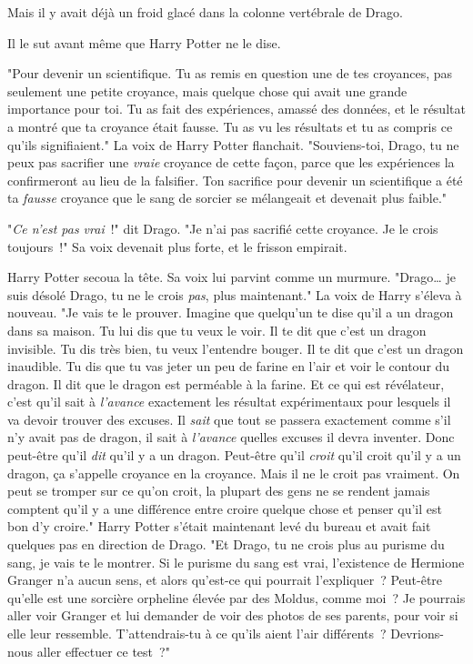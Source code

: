 Mais il y avait déjà un froid glacé dans la colonne vertébrale de Drago.

Il le sut avant même que Harry Potter ne le dise.

"Pour devenir un scientifique. Tu as remis en question une de tes croyances, pas seulement une petite croyance, mais quelque chose qui avait une grande importance pour toi. Tu as fait des expériences, amassé des données, et le résultat a montré que ta croyance était fausse. Tu as vu les résultats et tu as compris ce qu'ils signifiaient." La voix de Harry Potter flanchait. "Souviens-toi, Drago, tu ne peux pas sacrifier une \emph{vraie} croyance de cette façon, parce que les expériences la confirmeront au lieu de la falsifier. Ton sacrifice pour devenir un scientifique a été ta \emph{fausse} croyance que le sang de sorcier se mélangeait et devenait plus faible."

"\emph{Ce n'est pas vrai}~!" dit Drago. "Je n'ai pas sacrifié cette croyance. Je le crois toujours~!" Sa voix devenait plus forte, et le frisson empirait.

Harry Potter secoua la tête. Sa voix lui parvint comme un murmure. "Drago… je suis désolé Drago, tu ne le crois \emph{pas}, plus maintenant." La voix de Harry s'éleva à nouveau. "Je vais te le prouver. Imagine que quelqu'un te dise qu'il a un dragon dans sa maison. Tu lui dis que tu veux le voir. Il te dit que c'est un dragon invisible. Tu dis très bien, tu veux l'entendre bouger. Il te dit que c'est un dragon inaudible. Tu dis que tu vas jeter un peu de farine en l'air et voir le contour du dragon. Il dit que le dragon est perméable à la farine. Et ce qui est révélateur, c'est qu'il sait à \emph{l'avance} exactement les résultat expérimentaux pour lesquels il va devoir trouver des excuses. Il \emph{sait} que tout se passera exactement comme s'il n'y avait pas de dragon, il sait à \emph{l'avance} quelles excuses il devra inventer. Donc peut-être qu'il \emph{dit} qu'il y a un dragon. Peut-être qu'il \emph{croit} qu'il croit qu'il y a un dragon, ça s'appelle croyance en la croyance. Mais il ne le croit pas vraiment. On peut se tromper sur ce qu'on croit, la plupart des gens ne se rendent jamais comptent qu'il y a une différence entre croire quelque chose et penser qu'il est bon d'y croire." Harry Potter s'était maintenant levé du bureau et avait fait quelques pas en direction de Drago. "Et Drago, tu ne crois plus au purisme du sang, je vais te le montrer. Si le purisme du sang est vrai, l'existence de Hermione Granger n'a aucun sens, et alors qu'est-ce qui pourrait l'expliquer~? Peut-être qu'elle est une sorcière orpheline élevée par des Moldus, comme moi~? Je pourrais aller voir Granger et lui demander de voir des photos de ses parents, pour voir si elle leur ressemble. T'attendrais-tu à ce qu'ils aient l'air différents~? Devrions-nous aller effectuer ce test~?"


